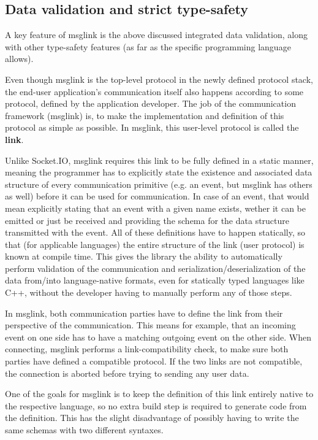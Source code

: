 \documentclass[conference]{IEEEtran}
\begin{document}
\subsection{Data validation and strict type-safety}

A key feature of msglink is the above discussed integrated data validation, along with other type-safety features (as far as the specific programming language allows).

Even though msglink is the top-level protocol in the newly defined protocol stack, the end-user application's communication itself also happens according to some protocol, defined by the application developer. The job of the communication framework (msglink) is, to make the implementation and definition of this protocol as simple as possible. In msglink, this user-level protocol is called the \textbf{link}.

Unlike Socket.IO, msglink requires this link to be fully defined in a static manner, meaning the programmer has to explicitly state the existence and associated data structure of every communication primitive (e.g. an event, but msglink has others as well) before it can be used for communication. In case of an event, that would mean explicitly stating that an event with a given name exists, wether it can be emitted or just be received and providing the schema for the data structure transmitted with the event. All of these definitions have to happen statically, so that (for applicable languages) the entire structure of the link (user protocol) is known at compile time. This gives the library the ability to automatically perform validation of the communication and serialization/deserialization of the data from/into language-native formats, even for statically typed languages like C++, without the developer having to manually perform any of those steps.

In msglink, both communication parties have to define the link from their perspective of the communication. This means for example, that an incoming event on one side has to have a matching outgoing event on the other side. When connecting, msglink performs a link-compatibility check, to make sure both parties have defined a compatible protocol. If the two links are not compatible, the connection is aborted before trying to sending any user data.

One of the goals for msglink is to keep the definition of this link entirely native to the respective language, so no extra build step is required to generate code from the definition. This has the slight disadvantage of possibly having to write the same schemas with two different syntaxes. 
\end{document}
